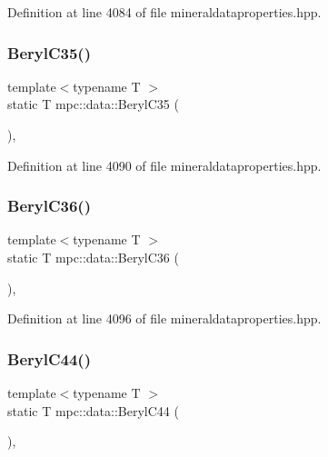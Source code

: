 Definition at line 4084 of file mineraldataproperties.\+hpp.

\mbox{\label{namespacempc_1_1data_aed08ee7c40c42f8b3ec77aa9b7f17ee6}} 
\subsubsection{\texorpdfstring{Beryl\+C35()}{BerylC35()}}
{\footnotesize\ttfamily template$<$typename T $>$ \\
static T mpc\+::data\+::\+Beryl\+C35 (\begin{DoxyParamCaption}{ }\end{DoxyParamCaption})\hspace{0.3cm}{\ttfamily [inline]}, {\ttfamily [static]}}



Definition at line 4090 of file mineraldataproperties.\+hpp.

\mbox{\label{namespacempc_1_1data_a91605388a6644b9594b813449eb9b3fc}} 
\subsubsection{\texorpdfstring{Beryl\+C36()}{BerylC36()}}
{\footnotesize\ttfamily template$<$typename T $>$ \\
static T mpc\+::data\+::\+Beryl\+C36 (\begin{DoxyParamCaption}{ }\end{DoxyParamCaption})\hspace{0.3cm}{\ttfamily [inline]}, {\ttfamily [static]}}



Definition at line 4096 of file mineraldataproperties.\+hpp.

\mbox{\label{namespacempc_1_1data_a49fcc3569e92d83d14c2e18782998f8f}} 
\subsubsection{\texorpdfstring{Beryl\+C44()}{BerylC44()}}
{\footnotesize\ttfamily template$<$typename T $>$ \\
static T mpc\+::data\+::\+Beryl\+C44 (\begin{DoxyParamCaption}{ }\end{DoxyParamCaption})\hspace{0.3cm}{\ttfamily [inline]}, {\ttfamily [static]}}



